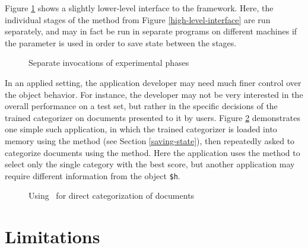 Figure \ref{medium-level-interface} shows a slightly lower-level
interface to the framework.  Here, the individual stages of the
 method from Figure \ref{high-level-interface}
are run separately, and may in fact be run in separate programs on
different machines if the  parameter is used in
order to save state between the stages.

\begin{figure}
\caption{Separate invocations of experimental phases}
\label{medium-level-interface}
\end{figure}

In an applied setting, the application developer may need much finer
control over the object behavior.  For instance, the developer may not
be very interested in the overall performance on a test set, but
rather in the specific decisions of the trained categorizer on
documents presented to it by users.  Figure
\ref{application-interface} demonstrates one simple such application,
in which the trained categorizer is loaded into memory using the
 method (see Section \ref{saving-state}), then repeatedly asked to categorize
documents using the  method.  Here the application
uses the  method to select only the single
category with the best score, but another application may require
different information from the  object \texttt{\$h}.

\begin{figure}
\caption{Using \aicat\ for direct categorization of documents}
\label{application-interface}
\end{figure}



\section{Limitations}

